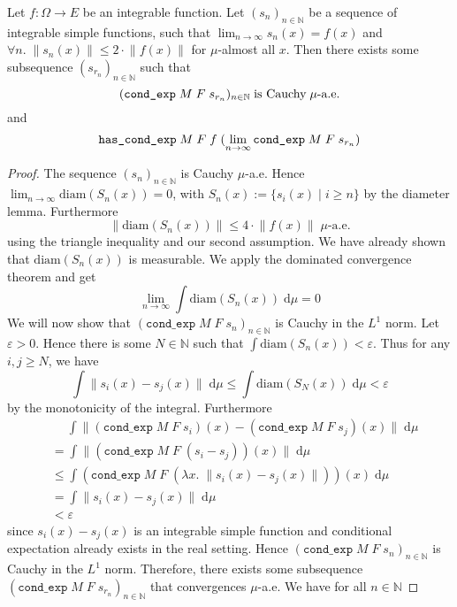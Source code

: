 \begin{lemma}
	Let $f : \Omega \rightarrow E$ be an integrable function. Let $(s_n)_{n \in \mathbb{N}}$ be a sequence of integrable simple functions, such that $\lim_{n \to \infty} s_n(x) = f(x)$ and $\forall n. \;\lVert s_n(x) \rVert \le 2 \cdot \lVert f(x) \rVert$ for $\mu$-almost all $x$. Then there exists some subsequence $(s_{r_n})_{n \in \mathbb{N}}$ such that
	\[
		\normalfont (\texttt{cond\_exp} \; M \; F \; s_{r_n})_{n \in \mathbb{N}} \; \textrm{is Cauchy} \; \mu\textrm{-a.e.}
	\]
	and
	\[
		\normalfont \texttt{has\_cond\_exp} \; M \; F \; f \; (\lim_{n \to \infty} \texttt{cond\_exp} \; M \; F \; s_{r_n})
	\]
\end{lemma}
\begin{proof}
	The sequence $(s_n)_{n \in \mathbb{N}}$ is Cauchy $\mu$-a.e. Hence $\lim_{n \to \infty} \textrm{diam}(S_n(x)) = 0$, with $S_n(x) := \{s_i(x) \; \vert \; i \ge n \}$ by the diameter lemma. Furthermore
	\[
		\lVert\textrm{diam}(S_n(x))\rVert \le 4 \cdot \lVert f(x) \rVert \; \mu\textrm{-a.e.}
	\]
	using the triangle inequality and our second assumption. We have already shown that $\textrm{diam}(S_n(x))$ is measurable. We apply the dominated convergence theorem and get
	\[
		\lim_{n \to \infty} \int \textrm{diam}(S_n(x)) \; \textrm{d}\mu = 0
	\]
	We will now show that $(\texttt{cond\_exp} \; M \; F \; s_n)_{n \in \mathbb{N}}$ is Cauchy in the $L^1$ norm.
	Let $\varepsilon > 0$. Hence there is some $N \in \mathbb{N}$ such that $\int \textrm{diam}(S_n(x)) < \varepsilon$. Thus for any $i,j \ge N$, we have
	\[
		\int \lVert s_i(x) - s_j(x) \rVert \; \textrm{d}\mu \le \int \textrm{diam}(S_N(x)) \; \textrm{d}\mu < \varepsilon
	\]
	by the monotonicity of the integral. Furthermore
	\begin{align*}
		&\quad\;\int \lVert (\texttt{cond\_exp} \; M \; F \; s_i)(x) - (\texttt{cond\_exp} \; M \; F \; s_j)(x) \rVert \; \textrm{d}\mu \\
		&= \int \lVert (\texttt{cond\_exp} \; M \; F \; (s_i - s_j))(x) \rVert \; \textrm{d}\mu \\
		&\le \int (\texttt{cond\_exp} \; M \; F \; (\lambda x.\; \lVert s_i(x) - s_j(x)\rVert))(x) \; \textrm{d}\mu \\
		&= \int \lVert s_i(x) - s_j(x)\rVert \; \textrm{d}\mu \\
		&< \varepsilon
	\end{align*}
	since $s_i(x)-s_j(x)$ is an integrable simple function and conditional expectation already exists in the real setting. Hence $(\texttt{cond\_exp} \; M \; F \; s_n)_{n \in \mathbb{N}}$ is Cauchy in the $L^1$ norm. Therefore, there exists some subsequence $(\texttt{cond\_exp} \; M \; F \; s_{r_n})_{n \in \mathbb{N}}$ that convergences $\mu$-a.e. We have for all $n \in \mathbb{N}$

\end{proof}
